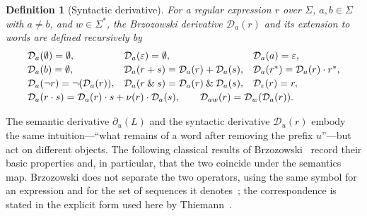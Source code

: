 \documentclass{article}
\newtheorem{definition}{Definition}[section]
\begin{document}
\begin{definition}[Syntactic derivative]\label{def:regex-symbol-derivative}\label{def:regex-derivative}
For a regular expression $r$ over $\Sigma$, $a,b\in\Sigma$ with $a\neq b$, and
$w\in\Sigma^*$, the Brzozowski derivative $\mathcal D_a(r)$ and its extension to words
are defined recursively by
\[
\begin{array}{l@{\quad}l@{\quad}l}
    \mathcal{D}_a(\emptyset) = \emptyset, &
    \mathcal{D}_a(\varepsilon) = \emptyset, &
    \mathcal{D}_a(a) = \varepsilon,\\[0.5ex]
    \mathcal{D}_a(b) = \emptyset, &
    \mathcal{D}_a(r+s) = \mathcal{D}_a(r)+\mathcal{D}_a(s), &
    \mathcal{D}_a(r^*) = \mathcal{D}_a(r)\cdot r^*,\\[0.5ex]
    \mathcal{D}_a(\neg r) = \neg(\mathcal{D}_a(r)), &
    \mathcal{D}_a(r\:\&\:s) = \mathcal{D}_a(r)\:\&\:\mathcal{D}_a(s), &
    \mathcal{D}_\varepsilon(r)=r,\\[0.5ex]
    \multicolumn{3}{l}{\mathcal{D}_a(r\cdot s) = \mathcal{D}_a(r)\cdot s + \nu(r)\cdot \mathcal{D}_a(s),
    \qquad \mathcal{D}_{aw}(r)=\mathcal{D}_w(\mathcal{D}_a(r)).}
\end{array}
\]
\end{definition}

The semantic derivative $\partial_u(L)$ and the syntactic derivative $\mathcal D_u(r)$
embody the same intuition---``what remains of a word after removing the prefix
$u$''---but act on different objects. The following classical results of
Brzozowski~\cite{B64} record their basic properties and, in particular, that the two
coincide under the semantics map. Brzozowski does not separate the two operators, using
the same symbol for an expression and for the set of sequences it
denotes~\cite{B64}; the correspondence is stated in the explicit form used here
by Thiemann~\cite{Thiemann2016}.
\end{document}
